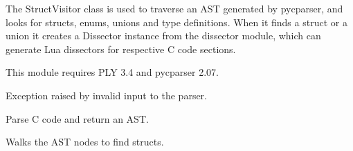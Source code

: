 \documentclass[A4paper,10pt,english]{sphinxmanual}
\begin{document}
The StructVisitor class is used to traverse an AST generated by pycparser,
and looks for structs, enums, unions and type definitions. When it finds
a struct or a union it creates a Dissector instance from the dissector
module, which can generate Lua dissectors for respective C code sections.

This module requires PLY 3.4 and pycparser 2.07.

\begin{fulllineitems}
\label{devel/code:cparser.ParseError}
Exception raised by invalid input to the parser.

\end{fulllineitems}


\begin{fulllineitems}
\label{devel/code:cparser.parse}
Parse C code and return an AST.

\end{fulllineitems}


\begin{fulllineitems}
\label{devel/code:cparser.find_structs}
Walks the AST nodes to find structs.

\end{fulllineitems}

\end{document}
